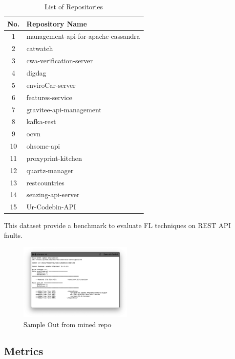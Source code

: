 \documentclass[conference]{IEEEtran}
\begin{document}
\begin{table}[ht]
    \centering
    \caption{List of Repositories}
    \label{tab:repositories}
    \begin{tabular}{|c|l|}
    \hline
    \textbf{No.} & \textbf{Repository Name} \\ \hline
    1 & management-api-for-apache-cassandra \\ \hline
    2 & catwatch \\ \hline
    3 & cwa-verification-server \\ \hline
    4 & digdag \\ \hline
    5 & enviroCar-server \\ \hline
    6 & features-service \\ \hline
    7 & gravitee-api-management \\ \hline
    8 & kafka-rest \\ \hline
    9 & ocvn \\ \hline
    10 & ohsome-api \\ \hline
    11 & proxyprint-kitchen \\ \hline
    12 & quartz-manager \\ \hline
    13 & restcountries \\ \hline
    14 & senzing-api-server \\ \hline
    15 & Ur-Codebin-API \\ \hline
    \end{tabular}
    \end{table}
    

This dataset provide a benchmark to evaluate FL techniques on REST API faults.


\begin{figure}[ht]
    \centering
    \includegraphics[width=0.5\textwidth]{img1.png}
    \caption{Sample Out from mined repo}
    \label{fig:outputOfMine}
    \end{figure}
    

\subsection{Metrics}
\label{sec:metrics}
\end{document}
